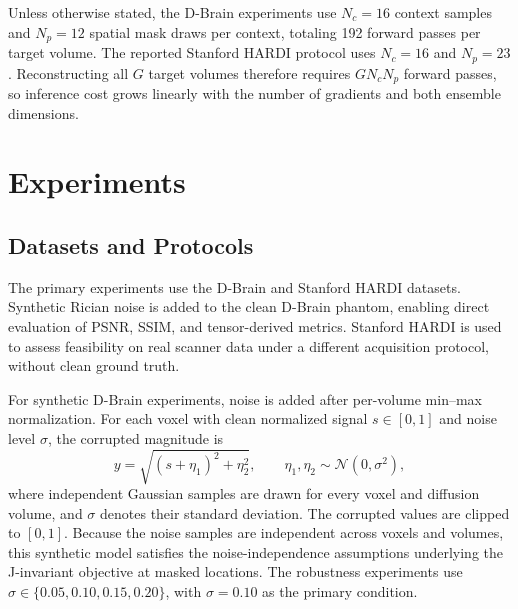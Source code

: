 \documentclass[preprint,12pt]{elsarticle}
\begin{document}
Unless otherwise stated, the D-Brain experiments use $N_c=16$ context samples and $N_p=12$ spatial mask draws per context, totaling 192 forward passes per target volume. The reported Stanford HARDI protocol uses $N_c=16$ and $N_p=23$. Reconstructing all $G$ target volumes therefore requires $G N_c N_p$ forward passes, so inference cost grows linearly with the number of gradients and both ensemble dimensions.

\section{Experiments}
\subsection{Datasets and Protocols}
The primary experiments use the D-Brain and Stanford HARDI datasets. Synthetic Rician noise is added to the clean D-Brain phantom, enabling direct evaluation of PSNR, SSIM, and tensor-derived metrics. Stanford HARDI is used to assess feasibility on real scanner data under a different acquisition protocol, without clean ground truth.

For synthetic D-Brain experiments, noise is added after per-volume min--max normalization. For each voxel with clean normalized signal $s \in [0,1]$ and noise level $\sigma$, the corrupted magnitude is
\begin{equation}
  y = \sqrt{(s + \eta_1)^2 + \eta_2^2},
  \qquad \eta_1,\eta_2 \sim \mathcal{N}(0,\sigma^2),
  \label{eq:rician-noise}
\end{equation}
where independent Gaussian samples are drawn for every voxel and diffusion volume, and $\sigma$ denotes their standard deviation. The corrupted values are clipped to $[0,1]$. Because the noise samples are independent across voxels and volumes, this synthetic model satisfies the noise-independence assumptions underlying the J-invariant objective at masked locations. The robustness experiments use $\sigma \in \{0.05,0.10,0.15,0.20\}$, with $\sigma=0.10$ as the primary condition.
\end{document}
